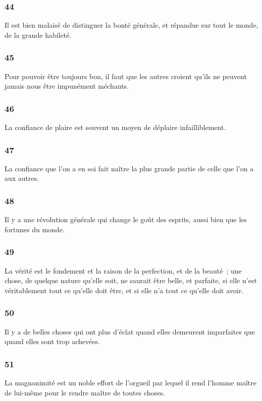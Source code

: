 \documentclass[french,twoside]{book} %
\begin{document}
\subsubsection[{44}]{ \textsc{44} }
\noindent Il est bien malaisé de distinguer la bonté générale, et répandue sur tout le monde, de la grande habileté.
\subsubsection[{45}]{ \textsc{45} }
\noindent Pour pouvoir être toujours bon, il faut que les autres croient qu’ils ne peuvent jamais nous être impunément méchants.
\subsubsection[{46}]{ \textsc{46} }
\noindent La confiance de plaire est souvent un moyen de déplaire infailliblement.
\subsubsection[{47}]{ \textsc{47} }
\noindent La confiance que l’on a en soi fait naître la plus grande partie de celle que l’on a aux autres.
\subsubsection[{48}]{ \textsc{48} }
\noindent Il y a une révolution générale qui change le goût des esprits, aussi bien que les fortunes du monde.
\subsubsection[{49}]{ \textsc{49} }
\noindent La vérité est le fondement et la raison de la perfection, et de la beauté ; une chose, de quelque nature qu’elle soit, ne saurait être belle, et parfaite, si elle n’est véritablement tout ce qu’elle doit être, et si elle n’a tout ce qu’elle doit avoir.
\subsubsection[{50}]{ \textsc{50} }
\noindent Il y a de belles choses qui ont plus d’éclat quand elles demeurent imparfaites que quand elles sont trop achevées.
\subsubsection[{51}]{ \textsc{51} }
\noindent La magnanimité est un noble effort de l’orgueil par lequel il rend l’homme maître de lui-même pour le rendre maître de toutes choses.
\end{document}
